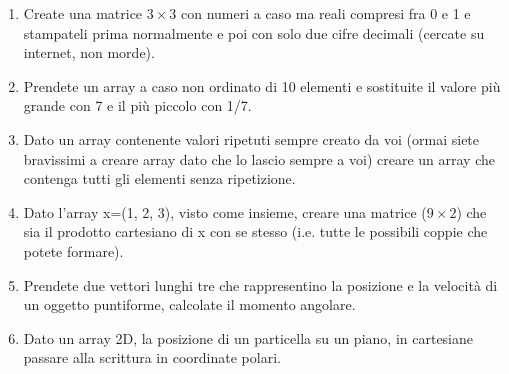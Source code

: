 \documentclass[10pt,a4paper]{article}
\begin{document}
\begin{enumerate}
\item Create una matrice $3 \times 3$ con numeri a caso ma reali compresi fra 0 e 1 e stampateli prima normalmente e poi con solo due cifre decimali (cercate su internet, non morde).
\item Prendete un array a caso non ordinato di 10 elementi e sostituite il valore più grande con 7 e il più piccolo con 1/7.
\item Dato un array contenente valori ripetuti sempre creato da voi (ormai siete bravissimi a creare array dato che lo lascio sempre a voi) creare un array che contenga tutti gli elementi senza ripetizione.
\item Dato l'array x=(1, 2, 3), visto come insieme, creare una matrice ($9\times2$) che sia il prodotto cartesiano di x con se stesso (i.e. tutte le possibili coppie che potete formare).
\item Prendete due vettori lunghi tre che rappresentino la posizione e la velocità di un oggetto puntiforme, calcolate il momento angolare.
\item Dato un array 2D, la posizione di un particella su un piano, in cartesiane passare alla scrittura in coordinate polari.
\end{enumerate}
\bigskip
\end{document}
